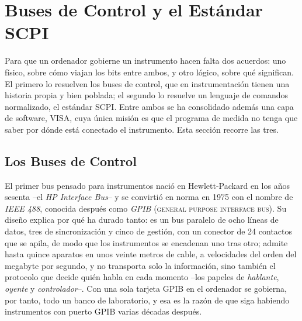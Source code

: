 
\section{Buses de Control y el Estándar SCPI}\label{sec:scpi}

Para que un ordenador gobierne un instrumento hacen falta dos acuerdos: uno físico, sobre cómo viajan los bits entre ambos, y otro lógico, sobre qué significan. El primero lo resuelven los buses de control, que en instrumentación tienen una historia propia y bien poblada; el segundo lo resuelve un lenguaje de comandos normalizado, el estándar SCPI. Entre ambos se ha consolidado además una capa de software, VISA, cuya única misión es que el programa de medida no tenga que saber por dónde está conectado el instrumento. Esta sección recorre las tres.

\subsection{Los Buses de Control}\label{sub:buses_control}

El primer bus pensado para instrumentos nació en Hewlett-Packard en los años sesenta --el \emph{HP Interface Bus}-- y se convirtió en norma en 1975 con el nombre de \emph{IEEE 488}, conocida después como \emph{GPIB} (\textsc{general purpose interface bus}). Su diseño explica por qué ha durado tanto: es un bus paralelo de ocho líneas de datos, tres de sincronización y cinco de gestión, con un conector de 24 contactos que se apila, de modo que los instrumentos se encadenan uno tras otro; admite hasta quince aparatos en unos veinte metros de cable, a velocidades del orden del megabyte por segundo, y no transporta solo la información, sino también el protocolo que decide quién habla en cada momento --los papeles de \emph{hablante}, \emph{oyente} y \emph{controlador}--. Con una sola tarjeta GPIB en el ordenador se gobierna, por tanto, todo un banco de laboratorio, y esa es la razón de que siga habiendo instrumentos con puerto GPIB varias décadas después.

